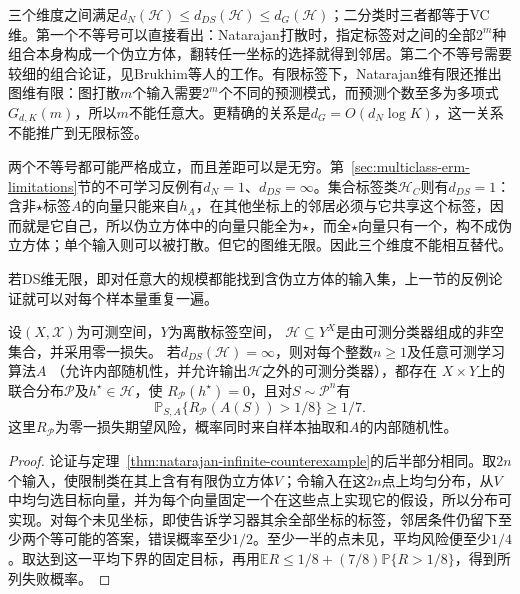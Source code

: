 \label{thm:learning-multiclass-dimension-comparison}
三个维度之间满足$d_N(\mathcal H)\leq d_{DS}(\mathcal H)\leq d_G(\mathcal H)$；二分类时三者都等于VC维。第一个不等号可以直接看出：Natarajan打散时，指定标签对之间的全部$2^m$种组合本身构成一个伪立方体，翻转任一坐标的选择就得到邻居。第二个不等号需要较细的组合论证，见Brukhim等人的工作。有限标签下，Natarajan维有限还推出图维有限：图打散$m$个输入需要$2^m$个不同的预测模式，而预测个数至多为多项式$G_{d,K}(m)$，所以$m$不能任意大。更精确的关系是$d_G=O(d_N\log K)$，这一关系不能推广到无限标签。

两个不等号都可能严格成立，而且差距可以是无穷。第~\ref{sec:multiclass-erm-limitations}节的不可学习反例有$d_N=1$、$d_{DS}=\infty$。集合标签类$\mathcal H_C$则有$d_{DS}=1$：含非$\star$标签$A$的向量只能来自$h_A$，在其他坐标上的邻居必须与它共享这个标签，因而就是它自己，所以伪立方体中的向量只能全为$\star$，而全$\star$向量只有一个，构不成伪立方体；单个输入则可以被打散。但它的图维无限。因此三个维度不能相互替代。

若DS维无限，即对任意大的规模都能找到含伪立方体的输入集，上一节的反例论证就可以对每个样本量重复一遍。

\begin{theorem}[无限DS维的不可学习性]
\label{thm:infinite-ds-lower-bound}
设$(X,\mathcal X)$为可测空间，$Y$为离散标签空间，
$\mathcal H\subseteq Y^X$是由可测分类器组成的非空集合，并采用零一损失。
若$d_{DS}(\mathcal H)=\infty$，则对每个整数$n\geq1$及任意可测学习算法$A$
（允许内部随机性，并允许输出$\mathcal H$之外的可测分类器），都存在
$X\times Y$上的联合分布$\mathcal P$及$h^\star\in\mathcal H$，使
$R_{\mathcal P}(h^\star)=0$，且对$S\sim\mathcal P^n$有
\[
 \mathbb P_{S,A}\{R_{\mathcal P}(A(S))>1/8\}\geq1/7.
\]
这里$R_{\mathcal P}$为零一损失期望风险，概率同时来自样本抽取和$A$的内部随机性。
\end{theorem}

\begin{proof}
论证与定理~\ref{thm:natarajan-infinite-counterexample}的后半部分相同。取$2n$个输入，使限制类在其上含有有限伪立方体$V$；令输入在这$2n$点上均匀分布，从$V$中均匀选目标向量，并为每个向量固定一个在这些点上实现它的假设，所以分布可实现。对每个未见坐标，即使告诉学习器其余全部坐标的标签，邻居条件仍留下至少两个等可能的答案，错误概率至少$1/2$。至少一半的点未见，平均风险便至少$1/4$。取达到这一平均下界的固定目标，再用$\mathbb E R\leq1/8+(7/8)\mathbb P\{R>1/8\}$，得到所列失败概率。
\end{proof}


